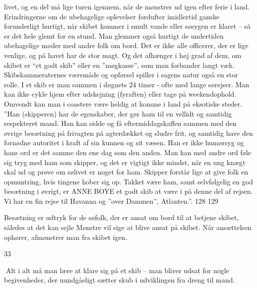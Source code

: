 livet, og en del må lige turen igennem, når de mønstrer ud igen efter
ferie i land. Erindringerne om de ubehagelige oplevelser fordufter
imidlertid ganske forunderligt hurtigt, når skibet kommer i smult vande
eller søsygen er klaret -- så er det hele glemt for en stund. Man
glemmer også hurtigt de undertiden ubehagelige møder med andre folk om
bord. Det er ikke alle officerer, der er lige venlige, og på havet har
de stor magt. Og det afhænger i høj grad af dem, om skibet er ``et godt
skib'' eller en ''møgkasse'', som man forbander langt væk.
Skibskammeraternes væremåde og opførsel spiller i sagens natur også en
stor rolle. I et skib er man sammen i døgnets 24 timer - ofte med lange
sørejser. Man kan ikke cykle hjem efter udskejning (fyraften) eller tage
på weekendophold. Omvendt kan man i coastere være heldig at komme i land
på eksotiske steder. ''Han (skipperen) har de egenskaber, der gør ham
til en vellidt og samtidig respekteret mand. Han kan sidde og få
eftermiddagskaffen sammen med den øvrige besætning på frivagten på
agterdækket og sludre frit, og samtidig have den fornødne autoritet i
kraft af sin kunnen og sit væsen. Han er ikke humørsyg og hans ord er
det samme den ene dag som den anden. Man kan med andre ord føle sig tryg
med ham som skipper, og det er vigtigt ikke mindst, når en ung knægt
skal ud og prøve om sølivet er noget for ham. Skipper forstår lige at
give folk en opmuntring, hvis tingene hober sig op. Takket være ham,
samt selvfølgelig en god besætning i øvrigt, er ANNE BOYE et godt skib
at være i på denne del af rejsen. Vi har en fin rejse til Havanna og
''over Dammen'', Atlanten.''. 128 129

Besætning er udtryk for de søfolk, der er ansat om bord til at betjene
skibet, således at det kan sejle Mønstre vil sige at blive ansat på
skibet. Når ansættelsen ophører, afmønstrer man fra skibet igen.

33

Alt i alt må man lære at klare sig på et skib -- man bliver udsat for
nogle begivenheder, der uundgåeligt sætter skub i udviklingen fra dreng
til mand.
